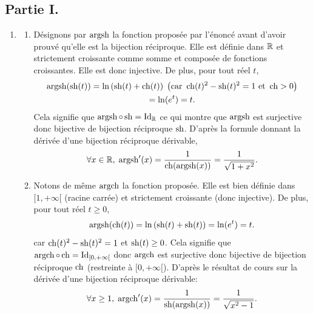 \subsection*{Partie I.}
\begin{enumerate}
  \item 
\begin{enumerate}
  \item Désignons par $\operatorname{argsh}$ la fonction proposée par l'énoncé avant d'avoir prouvé qu'elle est la bijection réciproque. Elle est définie dans $\mathbb{R}$ et strictement croissante comme somme et composée de fonctions croissantes. Elle est donc injective. De plus, pour tout réel $t$,
\begin{multline*}
\operatorname{argsh}(\operatorname{sh}(t)) = \ln\left( \operatorname{sh}(t) + \operatorname{ch}(t)\right) \; \left(\text{car } \operatorname{ch}(t)^2 - \operatorname{sh}(t)^2 = 1 \text{ et } \operatorname{ch} > 0\right) \\
=\ln(e^t) = t.
\end{multline*}
Cela signifie que $\operatorname{argsh} \circ \operatorname{sh} = \operatorname{Id}_{\mathbb{R}}$ ce qui montre que $\operatorname{argsh}$ est surjective donc bijective de bijection réciproque $\operatorname{sh}$. D'après la formule donnant la dérivée d'une bijection réciproque dérivable,
\begin{displaymath}
\forall x\in\mathbb{R},\;  {\operatorname{argsh}}'(x) = \frac{1}{\operatorname{ch}(\operatorname{argsh}(x))} = \frac{1}{\sqrt{1+x^2}}.
\end{displaymath}

  \item Notons de même $\operatorname{argch}$ la fonction proposée. Elle est bien définie dans $[1,+\infty[$ (racine carrée) et strictement croissante (donc injective).\newline
De plus, pour tout réel $t\geq 0$,
\begin{displaymath}
\operatorname{argsh}(\operatorname{ch}(t)) = \ln\left( \operatorname{sh}(t) + \operatorname{sh}(t)\right) = \ln(e^t) = t.
\end{displaymath}
car $\operatorname{ch}(t)^2 - \operatorname{sh}(t)^2 = 1$ et $\operatorname{sh}(t) \geq 0$.\newline
Cela signifie que $\operatorname{argch} \circ \operatorname{ch} = \operatorname{Id}_{[0,+\infty[}$ donc $\operatorname{argch}$ est surjective donc bijective de bijection réciproque $\operatorname{ch}$ (restreinte à $[0,+\infty[$).\newline
D'après le résultat de cours sur la dérivée d'une bijection réciproque dérivable:
\begin{displaymath}
\forall x\geq 1,\;  {\operatorname{argch}}'(x) = \frac{1}{\operatorname{sh}(\operatorname{argsh}(x))} = \frac{1}{\sqrt{x^2 - 1}}.
\end{displaymath}
\end{enumerate}


\end{enumerate}
